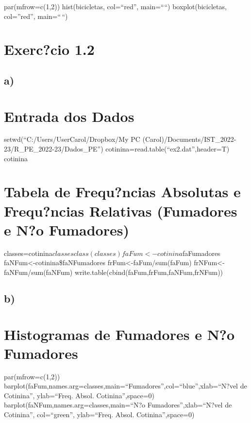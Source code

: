 \documentclass[
]{article}
\begin{document}
par(mfrow=c(1,2)) hist(bicicletas, col=``red'', main=````)
boxplot(bicicletas, col=''red'', main=``\,``)

\hypertarget{exerccio-1.2}{%
\section{Exerc?cio 1.2}\label{exerccio-1.2}}

\hypertarget{a-1}{%
\subsection{a)}\label{a-1}}

\hypertarget{entrada-dos-dados}{%
\section{Entrada dos Dados}\label{entrada-dos-dados}}

setwd(``C:/Users/UserCarol/Dropbox/My PC
(Carol)/Documents/IST\_2022-23/R\_PE\_2022-23/Dados\_PE'')
cotinina=read.table(``ex2.dat'',header=T) cotinina

\hypertarget{tabela-de-frequncias-absolutas-e-frequncias-relativas-fumadores-e-no-fumadores}{%
\section{Tabela de Frequ?ncias Absolutas e Frequ?ncias Relativas
(Fumadores e N?o
Fumadores)}\label{tabela-de-frequncias-absolutas-e-frequncias-relativas-fumadores-e-no-fumadores}}

classes=cotinina\(classes class(classes) faFum<-cotinina\)faFumadores
faNFum\textless-cotinina\$faNFumadores frFum\textless-faFum/sum(faFum)
frNFum\textless-faNFum/sum(faNFum)
write.table(cbind(faFum,frFum,faNFum,frNFum))

\hypertarget{b-1}{%
\subsection{b)}\label{b-1}}

\hypertarget{histogramas-de-fumadores-e-no-fumadores}{%
\section{Histogramas de Fumadores e N?o
Fumadores}\label{histogramas-de-fumadores-e-no-fumadores}}

par(mfrow=c(1,2))
barplot(faFum,names.arg=classes,main=``Fumadores'',col=``blue'',xlab=``N?vel
de Cotinina'', ylab=``Freq. Absol. Cotinina'',space=0)
barplot(faNFum,names.arg=classes,main=``N?o Fumadores'',xlab=``N?vel de
Cotinina'', col=``green'', ylab=``Freq. Absol. Cotinina'',space=0)
\end{document}
